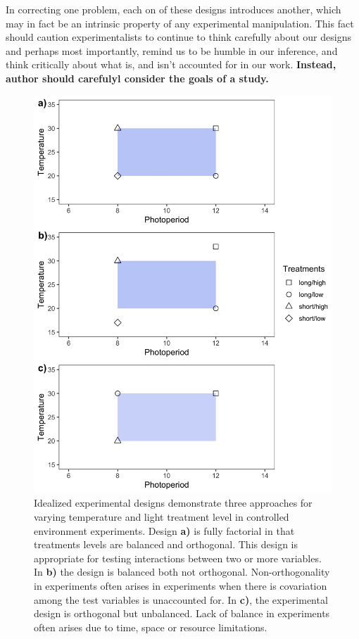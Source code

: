 \documentclass[11pt]{article}
\begin{document}
In correcting one problem, each on of these designs introduces another, which may in fact be an intrinsic property of any experimental manipulation. This fact should caution experimentalists to continue to think carefully about our designs and perhaps most importantly, remind us to be humble in our inference, and think critically about what is, and isn't accounted for in our work. \textbf{Instead, author should carefulyl consider the goals of a study.}



\begin{figure}[h!]
    \centering
 \includegraphics[width=.8\textwidth]{..//Plots/periodicity_figures/orthog.jpeg}
    \caption{Idealized experimental designs demonstrate three approaches for varying temperature and light treatment level in controlled environment experiments. Design \textbf{a)} is fully factorial in that treatments levels are balanced and orthogonal. This design is appropriate for testing interactions between two or more variables. In \textbf{b)} the design is balanced both not orthogonal. Non-orthogonality in experiments often arises in experiments when there is covariation among the test variables is unaccounted for. In \textbf{c)}, the experimental design is orthogonal but unbalanced. Lack of balance in experiments often arises due to time, space or resource limitations. }
    \label{fig:examp}
\end{figure}
\end{document}
